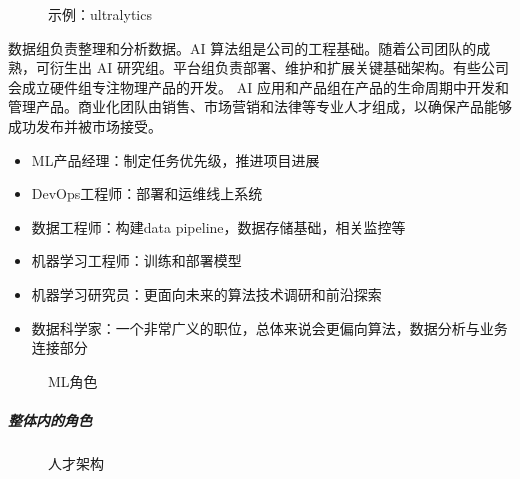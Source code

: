 \documentclass[letterpaper,11pt,english]{sphinxmanual}
\begin{document}
\begin{figure}[H]
\centering
\capstart

\noindent{}
\caption{示例：ultralytics}\label{\detokenize{chapter_introduction/AI_PM:id55}}\end{figure}

数据组负责整理和分析数据。AI
算法组是公司的工程基础。随着公司团队的成熟，可衍生出 AI
研究组。平台组负责部署、维护和扩展关键基础架构。有些公司会成立硬件组专注物理产品的开发。
AI
应用和产品组在产品的生命周期中开发和管理产品。商业化团队由销售、市场营销和法律等专业人才组成，以确保产品能够成功发布并被市场接受。
\begin{itemize}
\item {} 
ML产品经理：制定任务优先级，推进项目进展

\item {} 
DevOps工程师：部署和运维线上系统

\item {} 
数据工程师：构建data pipeline，数据存储基础，相关监控等

\item {} 
机器学习工程师：训练和部署模型

\item {} 
机器学习研究员：更面向未来的算法技术调研和前沿探索

\item {} 
数据科学家：一个非常广义的职位，总体来说会更偏向算法，数据分析与业务连接部分

\end{itemize}

\begin{figure}[H]
\centering
\capstart

\noindent{}
\caption{ML角色}\label{\detokenize{chapter_introduction/AI_PM:id56}}\end{figure}


\subparagraph{整体内的角色}
\label{\detokenize{chapter_introduction/AI_PM:id15}}
\begin{figure}[H]
\centering
\capstart

\noindent{}
\caption{人才架构\sphinxfootnotemark[240]}\label{\detokenize{chapter_introduction/AI_PM:id57}}\end{figure}
%
\begin{footnotetext}[240]\sphinxAtStartFootnote
{}
%
\end{footnotetext}\ignorespaces 
\end{document}
